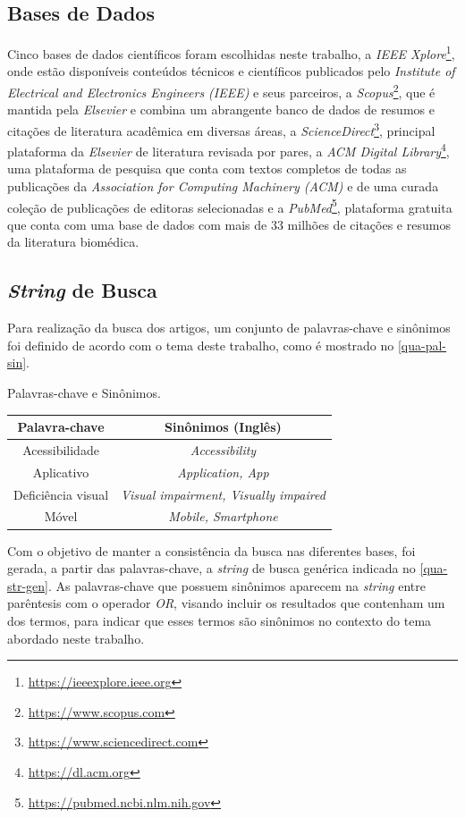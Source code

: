 \subsection{Bases de Dados}
Cinco bases de dados científicos foram escolhidas neste trabalho, a \emph{IEEE Xplore}\footnote{\url{https://ieeexplore.ieee.org}}, onde estão disponíveis conteúdos técnicos e científicos publicados pelo \emph{Institute of Electrical and Electronics Engineers (IEEE)} e seus parceiros, a \emph{Scopus}\footnote{\url{https://www.scopus.com}}, que é mantida pela \emph{Elsevier} e combina um abrangente banco de dados de resumos e citações de literatura acadêmica em diversas áreas, a \emph{ScienceDirect}\footnote{\url{https://www.sciencedirect.com}}, principal plataforma da \emph{Elsevier} de literatura revisada por pares, a \emph{ACM Digital Library}\footnote{\url{https://dl.acm.org}}, uma plataforma de pesquisa que conta com textos completos de todas as publicações da \emph{Association for Computing Machinery (ACM)} e de uma curada coleção de publicações de editoras selecionadas e a \emph{PubMed}\footnote{\url{https://pubmed.ncbi.nlm.nih.gov}}, plataforma gratuita que conta com uma base de dados com mais de 33 milhões de citações e resumos da literatura biomédica.

\subsection{\emph{String} de Busca}
Para realização da busca dos artigos, um conjunto de palavras-chave e sinônimos foi definido de acordo com o tema deste trabalho, como é mostrado no \autoref{qua-pal-sin}.

\begin{quadro}[htb]
\caption{\label{qua-pal-sin}Palavras-chave e Sinônimos.}
\begin{tabular}{|c|c|}
    \hline
   \textbf{Palavra-chave} & \textbf{Sinônimos (Inglês)} \\ \hline
    Acessibilidade & \emph{Accessibility} \\ \hline
    Aplicativo & \emph{Application, App} \\ \hline
    Deficiência visual & \emph{Visual impairment, Visually impaired} \\ \hline
    Móvel & \emph{Mobile, Smartphone} \\ \hline
\end{tabular}
\end{quadro}

Com o objetivo de manter a consistência da busca nas diferentes bases, foi gerada, a partir das palavras-chave, a \emph{string} de busca genérica indicada no \autoref{qua-str-gen}. As palavras-chave que possuem sinônimos aparecem na \emph{string} entre parêntesis com o operador \emph{OR}, visando incluir os resultados que contenham um dos termos, para indicar que esses termos são sinônimos no contexto do tema abordado neste trabalho.

